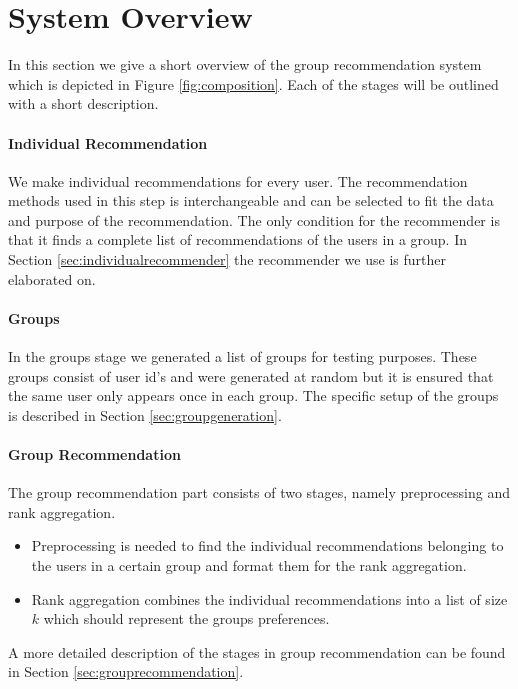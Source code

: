 \section{System Overview}\label{sec:systemoverview}
In this section we give a short overview of the group recommendation system which is depicted in Figure \ref{fig:composition}. Each of the stages will be outlined with a short description. 

\paragraph{Individual Recommendation} We make individual recommendations for every user. The recommendation methods used in this step is interchangeable and can be selected to fit the data and purpose of the recommendation. The only condition for the recommender is that it finds a complete list of recommendations of the users in a group. In Section \ref{sec:individualrecommender} the recommender we use is further elaborated on.

\paragraph{Groups} In the groups stage we generated a list of groups for testing purposes. These groups consist of user id's and were generated at random but it is ensured that the same user only appears once in each group. The specific setup of the groups is described in Section \ref{sec:groupgeneration}.

\paragraph{Group Recommendation} The group recommendation part consists of two stages, namely preprocessing and rank aggregation.
\begin{itemize}
\item Preprocessing is needed to find the individual recommendations belonging to the users in a certain group and format them for the rank aggregation.
\item Rank aggregation combines the individual recommendations into a list of size $k$ which should represent the groups preferences.
\end{itemize}
A more detailed description of the stages in group recommendation can be found in Section \ref{sec:grouprecommendation}.

